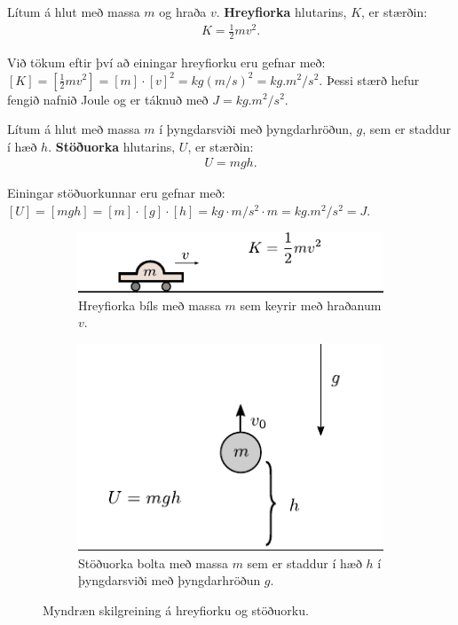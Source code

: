 \ifdefined \wholebook \else\documentclass[oneside]{book}\usepackage{EdlBook}\graphicspath{{figures/}}
\begin{document}
\begin{tcolorbox}
\begin{definition}
Lítum á hlut með massa $m$ og hraða $v$. 
\textbf{Hreyfiorka} hlutarins, $K$, er stærðin:
\begin{align*}
    K = \frac{1}{2}mv^2.
\end{align*}
\end{definition}
\end{tcolorbox}

Við tökum eftir því að einingar hreyfiorku eru gefnar með: $[K] = [\frac{1}{2}mv^2] = [m] \cdot [v]^2 = \si{kg (m/s)^2} = \si{kg.m^2/s^2}$. Þessi stærð hefur fengið nafnið Joule og er táknuð með $\si{J} = \si{kg.m^2/s^2}$.

\begin{tcolorbox}
\begin{definition}
Lítum á hlut með massa $m$ í þyngdarsviði með þyngdarhröðun, $g$, sem er staddur í hæð $h$.
\textbf{Stöðuorka} hlutarins, $U$, er stærðin:
\begin{align*}
    U = mgh.
\end{align*}
\end{definition}
\end{tcolorbox}
Einingar stöðuorkunnar eru gefnar með: $[U] = [mgh] = [m] \cdot [g] \cdot [h] = \si{kg} \cdot \si{m/s^2} \cdot \si{m} = \si{kg.m^2/s^2} = \si{J}$.

\begin{figure}[H]
    \centering
\begin{subfigure}[b]{.45\textwidth}
    \centering
    \includegraphics[scale = 1]{figures/hreyfiorka2.pdf}
    \caption{Hreyfiorka bíls með massa $m$ sem keyrir með hraðanum $v$.}
    \label{fig:hreyfiorka}
\end{subfigure}
\hfill
\begin{subfigure}[b]{.45\textwidth}
    \centering
    \includegraphics[scale = 1]{figures/stoduorkasimple.pdf}
    \caption{Stöðuorka bolta með massa $m$ sem er staddur í hæð $h$ í þyngdarsviði með þyngdarhröðun $g$.}
    \label{fig:stoduorkasimple}
\end{subfigure}
\caption{Myndræn skilgreining á hreyfiorku og stöðuorku.}
\end{figure}
\end{document}
